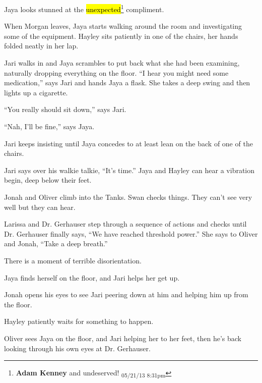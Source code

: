 Jaya looks stunned at the \hl{unexpected}\footnote{\textbf{Adam Kenney }and undeserved! \textsubscript{05/21/13 8:31pm}} compliment.



When Morgan leaves, Jaya starts walking around the room and investigating some of the equipment.  Hayley sits patiently in one of the chairs, her hands folded neatly in her lap.



Jari walks in and Jaya scrambles to put back what she had been examining, naturally dropping everything on the floor.  ``I hear you might need some medication,'' says Jari and hands Jaya a flask.  She takes a deep swing and then lights up a cigarette.



``You really should sit down,'' says Jari.

``Nah, I'll be fine,'' says Jaya.

Jari keeps insisting until Jaya concedes to at least lean on the back of one of the chairs.



Jari says over his walkie talkie, ``It's time.''   Jaya and Hayley can hear a vibration begin, deep below their feet.



Jonah and Oliver climb into the Tanks.  Swan checks things.  They can't see very well but they can hear.



Larissa and Dr. Gerhauser step through a sequence of actions and checks until Dr. Gerhauser finally says, ``We have reached threshold power.''  She says to Oliver and Jonah, ``Take a deep breath.''



There is a moment of terrible disorientation.



Jaya finds herself on the floor, and Jari helps her get up.



Jonah opens his eyes to see Jari peering down at him and helping him up from the floor.



Hayley patiently waits for something to happen.



Oliver sees Jaya on the floor, and Jari helping her to her feet, then he's back looking through his own eyes at Dr. Gerhauser.



